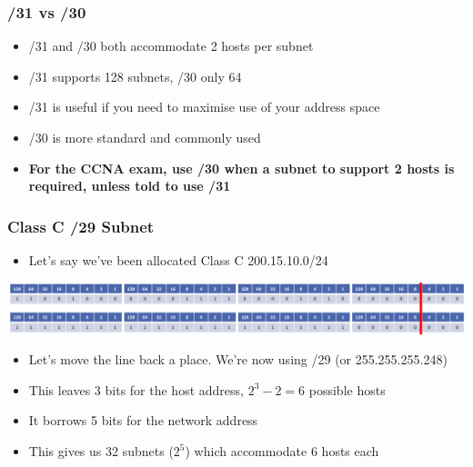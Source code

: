 \documentclass[pdflatex,compress]{beamer}
\begin{document}
\begin{frame}
	\frametitle{/31 vs /30}
	\begin{itemize}
		\item /31 and /30 both accommodate 2 hosts per subnet
		\item /31 supports 128 subnets, /30 only 64
		\item /31 is useful if you need to maximise use of your address space
		\item /30 is more standard and commonly used
		\item \textbf{For the CCNA exam, use /30 when a subnet to support 2 hosts is required, unless told to use /31}
	\end{itemize}
\end{frame}

\begin{frame}
	\frametitle{Class C /29 Subnet}
	\begin{itemize}
		\item Let's say we've been allocated Class C 200.15.10.0/24
	\end{itemize}
	\begin{center}
		\includegraphics[width=1\linewidth]{img/img05}
	\end{center}
	\begin{itemize}
		\item Let's move the line back a place. We're now using /29 (or 255.255.255.248)
		\item This leaves 3 bits for the host address, $ 2^3 - 2 = 6 $ possible hosts
		\item It borrows 5 bits for the network address
		\item This gives us 32 subnets ($ 2^5 $) which accommodate 6 hosts each
	\end{itemize}
\end{frame}
\end{document}
